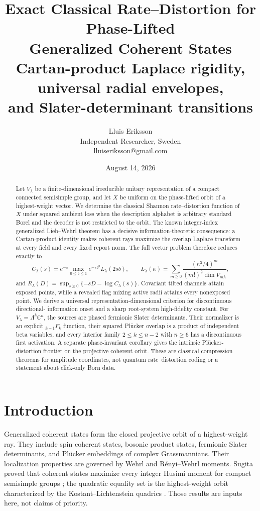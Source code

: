 \documentclass[11pt,a4paper]{article}
\title{\textbf{Exact Classical Rate--Distortion for Phase-Lifted\\
Generalized Coherent States}\\[2mm]
\large Cartan-product Laplace rigidity, universal radial envelopes,\\
and Slater-determinant transitions}
\author{Lluis Eriksson\\[-1mm]
\small Independent Researcher, Sweden\\
\small \href{mailto:lluiseriksson@gmail.com}{lluiseriksson@gmail.com}}
\date{August 14, 2026}
\newcommand{\C}{\mathbb C}
\begin{document}
\maketitle
\vspace{-1.3em}

\begin{abstract}
Let $V_\lambda$ be a finite-dimensional irreducible unitary representation
of a compact connected semisimple group, and let $X$ be uniform on the
phase-lifted orbit of a highest-weight vector.  We determine the classical
Shannon rate--distortion function of $X$ under squared ambient loss when the
description alphabet is arbitrary standard Borel and the decoder is not
restricted to the orbit.  The known integer-index generalized
Lieb--Wehrl theorem has a decisive information-theoretic consequence: a
Cartan-product identity makes coherent rays maximize the overlap Laplace
transform at every field and every fixed report norm.  The full vector
problem therefore reduces exactly to
\[
 C_\lambda(s)=e^{-s}\max_{0\le b\le1}
 e^{-sb^2}L_\lambda(2sb),\qquad
 L_\lambda(\kappa)=\sum_{m\ge0}
 \frac{(\kappa^2/4)^m}{(m!)^2\dim V_{m\lambda}},
\]
and $R_\lambda(D)=\sup_{s\ge0}\{-sD-\log C_\lambda(s)\}$.
Covariant tilted channels attain exposed points, while a revealed flag
mixing active radii attains every nonexposed point.  We derive a universal
representation-dimensional criterion for discontinuous directional-
information onset and a sharp root-system high-fidelity constant.  For
$V_\lambda=\Lambda^k\C^n$, the sources are phased fermionic Slater
determinants.  Their normalizer is an explicit ${}_{k-1}F_k$ function, their
squared Pl\"ucker overlap is a product of independent beta variables, and
every interior family $2\le k\le n-2$ with $n\ge6$ has a discontinuous first
activation.  A separate phase-invariant corollary gives the intrinsic
Pl\"ucker-distortion frontier on the projective coherent orbit.  These are
classical compression theorems for amplitude coordinates, not quantum
rate--distortion coding or a statement about click-only Born data.
\end{abstract}

\section{Introduction}

Generalized coherent states form the closed projective orbit of a
highest-weight ray.  They include spin coherent states, bosonic product
states, fermionic Slater determinants, and Pl\"ucker embeddings of complex
Grassmannians.  Their localization properties are governed by Wehrl and
R\'enyi--Wehrl moments.  Sugita proved that coherent states maximize every
integer Husimi moment for compact semisimple groups
\cite{Sugita2002}; the quadratic equality set is the highest-weight orbit
characterized by the Kostant--Lichtenstein quadrics
\cite{Lichtenstein1982,Baur2003}.  Those results are inputs here, not claims
of priority.
\end{document}
